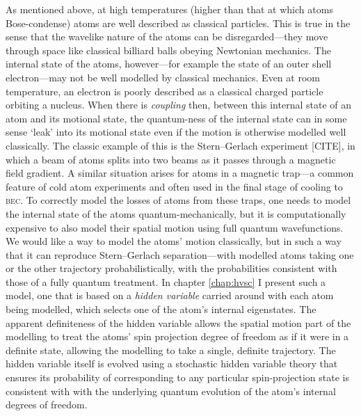 As mentioned above, at high temperatures (higher than that at which atoms Bose-condense) atoms are well described as classical particles. This is true in the sense that the wavelike nature of the atoms can be disregarded---they move through space like classical billiard balls obeying Newtonian mechanics. The internal state of the atoms, however---for example the state of an outer shell electron---may not be well modelled by classical mechanics. Even at room temperature, an electron is poorly described as a classical charged particle orbiting a nucleus. When there is \emph{coupling} then, between this internal state of an atom and its motional state, the quantum-ness of the internal state can in some sense `leak' into its motional state even if the motion is otherwise modelled well classically. The classic example of this is the Stern--Gerlach experiment [CITE], in which a beam of atoms splits into two beams as it passes through a magnetic field gradient. A similar situation arises for atoms in a magnetic trap---a common feature of cold atom experiments and often used in the final stage of cooling to \textsc{bec}. To correctly model the losses of atoms from these traps, one needs to model the internal state of the atoms quantum-mechanically, but it is computationally expensive to also model their spatial motion using full quantum wavefunctions. We would like a way to model the atoms' motion classically, but in such a way that it can reproduce Stern--Gerlach separation---with modelled atoms taking one or the other trajectory probabilistically, with the probabilities consistent with those of a fully quantum treatment. In chapter \ref{chap:hvsc} I present such a model, one that is based on a \emph{hidden variable} carried around with each atom being modelled, which selects one of the atom's internal eigenstates. The apparent definiteness of the hidden variable allows the spatial motion part of the modelling to treat the atoms' spin projection degree of freedom as if it were in a definite state, allowing the modelling to take a single, definite trajectory. The hidden variable itself is evolved using a stochastic hidden variable theory that ensures its probability of corresponding to any particular spin-projection state is consistent with with the underlying quantum evolution of the atom's internal degrees of freedom.